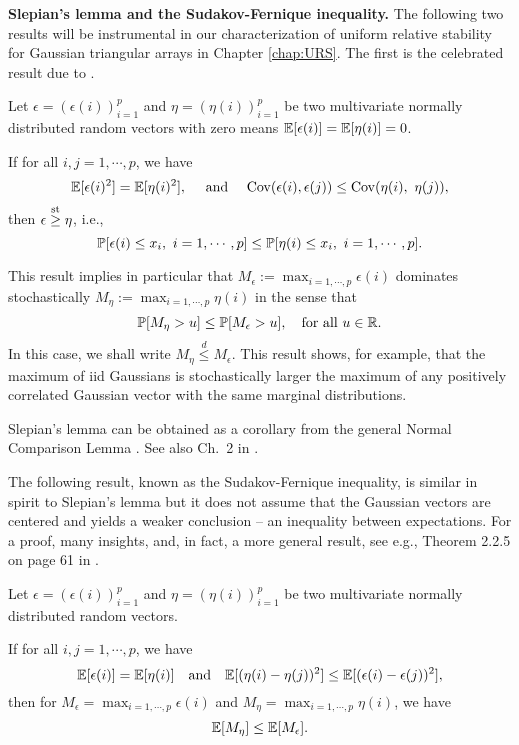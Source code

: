 {\bf Slepian's lemma and the Sudakov-Fernique inequality.} 
The following two results will be instrumental in our characterization of uniform relative stability for 
Gaussian triangular arrays in Chapter \ref{chap:URS}.  
The first is the celebrated result due to \citet{slepian1962one}.

\begin{theorem}\label{thm:Slepian-lemma} Let $\epsilon = (\epsilon(i))_{i=1}^p$ and $\eta = (\eta(i))_{i=1}^p$ be 
two multivariate normally distributed random vectors with zero means $\E [\epsilon(i)] = \E[\eta(i)] = 0$. 

 If for all $i,j=1,\cdots,p$, we have
$$
\E [\epsilon(i)^2] = \E[\eta(i)^2],\ \ \ \mbox{ and }\ \ \ {\rm Cov}(\epsilon(i),\epsilon(j)) \le {\rm Cov}(\eta(i),\ \eta(j)),
$$
 then $\epsilon \stackrel{{\rm st}}{\ge} \eta$, i.e.,
$$
\P [ \epsilon(i) \le x_i,\ i=1,\cdots,p] \le \P [ \eta(i) \le x_i,\ i=1,\cdots,p].
$$
\end{theorem}


This result implies in particular that $M_\epsilon:= \max_{i=1,\cdots,p}\epsilon(i)$ dominates stochastically $M_\eta:= \max_{i=1,\cdots,p} \eta(i)$ in the
sense that
\begin{equation}\label{e:Slepian-lemma-maxima}
 \P[ M_\eta > u] \le \P [M_\epsilon > u],\ \ \mbox{ for all }u\in\mathbb R.
\end{equation}
In this case, we shall write $M_\eta \stackrel{d}{\le} M_\epsilon$.  This result shows, for example, that the maximum of iid Gaussians is 
stochastically larger the maximum of any positively correlated Gaussian vector with the same marginal distributions. 

Slepian's lemma can be obtained as a corollary from the general Normal Comparison Lemma 
\citep[see, e.g., Theorem 4.2.1 on page 81 in][]{leadbetter2012extremes}.  See also Ch.\ 2 in \cite{adler2009random}.

The following result, known as the Sudakov-Fernique inequality, is similar in spirit to Slepian's lemma but it does not assume that the Gaussian 
vectors are centered and yields a weaker conclusion -- an inequality between expectations. For a proof, many insights, and, in fact, a more 
general result, see e.g., Theorem 2.2.5 on page 61 in \cite{adler2009random}.

\begin{theorem}  \label{th:Sudakov-Fernique} 
Let $\epsilon = (\epsilon(i))_{i=1}^p$ and $\eta = (\eta(i))_{i=1}^p$ be 
two multivariate normally distributed random vectors.

If for all $i,j=1,\cdots,p$, we have 
$$
\E [ \epsilon(i) ] = \E [\eta(i)] \ \ \mbox{ and }\ \ \E [ (\eta(i)-\eta(j))^2] \le \E [ (\epsilon(i)-\epsilon(j))^2],
$$
then for $M_\epsilon = \max_{i=1,\cdots,p}\epsilon(i)$ and $M_\eta = \max_{i=1,\cdots,p} \eta(i)$, we have 
$$
 \E [ M_\eta ] \le \E [M_\epsilon].
$$
\end{theorem}


